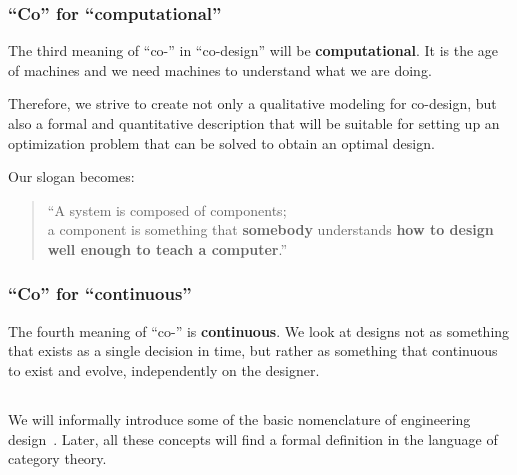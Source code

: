\subsubsection{``Co'' for ``computational''}

The third meaning of ``co-'' in ``co-design'' will be \textbf{computational}. It is the age of machines and we need
 machines to understand what we are doing. 

Therefore, we strive to create not only a qualitative modeling for co-design, but also a formal and quantitative description that will be suitable for setting up an optimization problem that can be solved to obtain an optimal design.

Our slogan becomes:

\begin{quote}
    \enquote{A system is composed of components;\\
      a component is something that \textbf{somebody} understands
      \textbf{how to design} \textbf{well enough to teach a computer}.}
\end{quote}


\subsubsection{``Co'' for ``continuous''}

The fourth meaning of ``co-'' is \textbf{continuous}. We look at designs not as something that exists
as a single decision in time, but rather as something that continuous to exist and evolve, independently 
on the designer.






\subsection{}

We will informally introduce some of the basic nomenclature of engineering
design~\cite{antonsson2005formal,deweck2011}. Later, all these concepts will find a formal
definition in the language of category theory.

